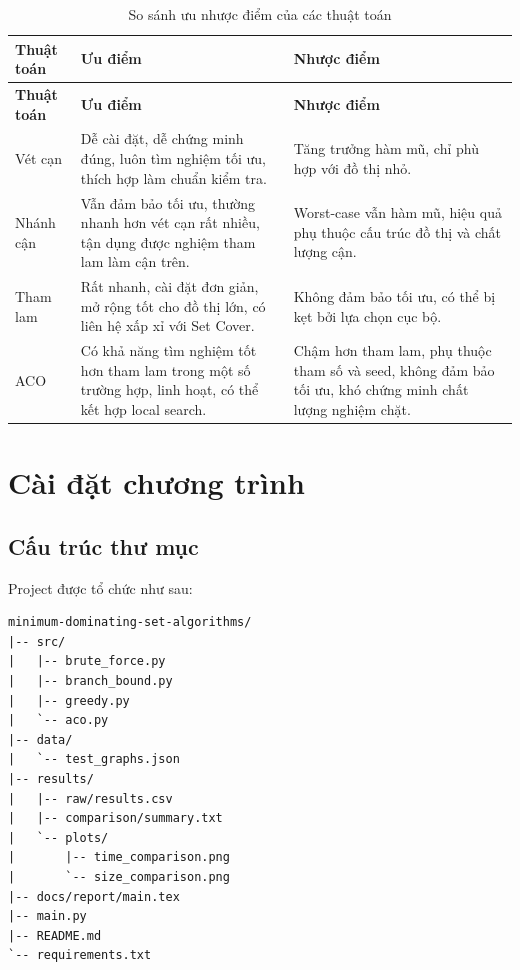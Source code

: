 \documentclass[12pt, a4paper]{report}
\begin{document}
\begin{longtable}{p{3cm} p{5cm} p{5cm}}
  \caption{So sánh ưu nhược điểm của các thuật toán}\\
  \toprule
  \textbf{Thuật toán} & \textbf{Ưu điểm} & \textbf{Nhược điểm} \\
  \midrule
  \endfirsthead
  \toprule
  \textbf{Thuật toán} & \textbf{Ưu điểm} & \textbf{Nhược điểm} \\
  \midrule
  \endhead
  Vét cạn &
  Dễ cài đặt, dễ chứng minh đúng, luôn tìm nghiệm tối ưu, thích hợp làm chuẩn kiểm tra. &
  Tăng trưởng hàm mũ, chỉ phù hợp với đồ thị nhỏ. \\
  \midrule
  Nhánh cận &
  Vẫn đảm bảo tối ưu, thường nhanh hơn vét cạn rất nhiều, tận dụng được nghiệm tham lam làm cận trên. &
  Worst-case vẫn hàm mũ, hiệu quả phụ thuộc cấu trúc đồ thị và chất lượng cận. \\
  \midrule
  Tham lam &
  Rất nhanh, cài đặt đơn giản, mở rộng tốt cho đồ thị lớn, có liên hệ xấp xỉ với Set Cover. &
  Không đảm bảo tối ưu, có thể bị kẹt bởi lựa chọn cục bộ. \\
  \midrule
  ACO &
  Có khả năng tìm nghiệm tốt hơn tham lam trong một số trường hợp, linh hoạt, có thể kết hợp local search. &
  Chậm hơn tham lam, phụ thuộc tham số và seed, không đảm bảo tối ưu, khó chứng minh chất lượng nghiệm chặt. \\
  \bottomrule
\end{longtable}

\chapter{Cài đặt chương trình}

\section{Cấu trúc thư mục}

Project được tổ chức như sau:

\begin{lstlisting}[caption={Cấu trúc thư mục project}]
minimum-dominating-set-algorithms/
|-- src/
|   |-- brute_force.py
|   |-- branch_bound.py
|   |-- greedy.py
|   `-- aco.py
|-- data/
|   `-- test_graphs.json
|-- results/
|   |-- raw/results.csv
|   |-- comparison/summary.txt
|   `-- plots/
|       |-- time_comparison.png
|       `-- size_comparison.png
|-- docs/report/main.tex
|-- main.py
|-- README.md
`-- requirements.txt
\end{lstlisting}
\end{document}
